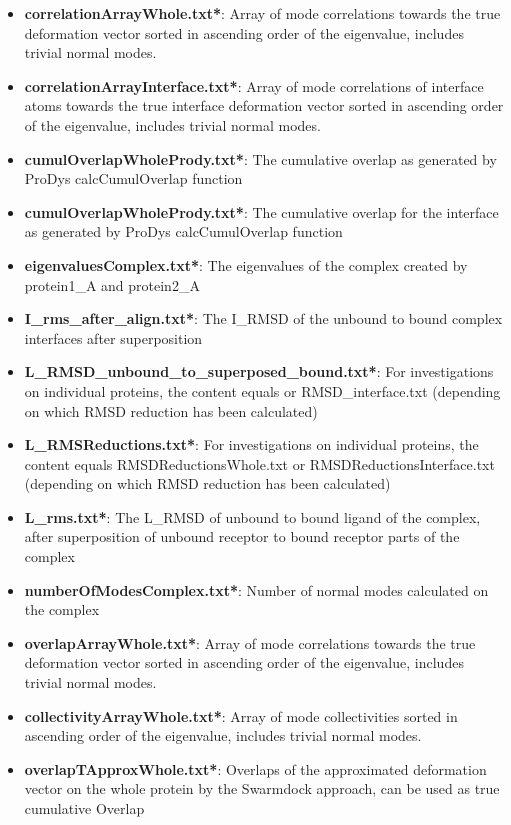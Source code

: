 \documentclass[11pt]{article}
\begin{document}
\begin{itemize}
 \item \textbf{correlationArrayWhole.txt*}: Array of mode correlations towards the true deformation vector sorted in ascending order of the eigenvalue, includes trivial normal modes.
 \item \textbf{correlationArrayInterface.txt*}: Array of mode correlations of interface atoms towards the true interface deformation vector sorted in ascending order of the eigenvalue, includes trivial normal modes.
 \item \textbf{cumulOverlapWholePrody.txt*}: The cumulative overlap as generated by ProDys calcCumulOverlap function
  \item \textbf{cumulOverlapWholePrody.txt*}: The cumulative overlap for the interface as generated by ProDys calcCumulOverlap function
 \item \textbf{eigenvaluesComplex.txt*}: The eigenvalues of the complex created by protein1\_A and protein2\_A
 \item \textbf{I\_rms\_after\_align.txt*}: The I\_RMSD of the unbound to bound complex interfaces after superposition
 \item \textbf{L\_RMSD\_unbound\_to\_superposed\_bound.txt*}: For investigations on individual proteins, the content equals  or RMSD\_interface.txt (depending on which RMSD reduction has been calculated)
 \item \textbf{L\_RMSReductions.txt*}: For investigations on individual proteins, the content equals RMSDReductionsWhole.txt or RMSDReductionsInterface.txt (depending on which RMSD reduction has been calculated)
 \item \textbf{L\_rms.txt*}: The L\_RMSD of unbound to bound ligand of the complex, after superposition of unbound receptor to bound receptor parts of the complex 
 \item \textbf{numberOfModesComplex.txt*}: Number of normal modes calculated on the complex
 \item \textbf{overlapArrayWhole.txt*}: Array of mode correlations towards the true deformation vector sorted in ascending order of the eigenvalue, includes trivial normal modes.
 \item \textbf{collectivityArrayWhole.txt*}: Array of mode collectivities sorted in ascending order of the eigenvalue, includes trivial normal modes.
  \item \textbf{overlapTApproxWhole.txt*}: Overlaps of the approximated deformation vector on the whole protein by the Swarmdock approach, can be used as true cumulative Overlap

\end{itemize}
\end{document}
